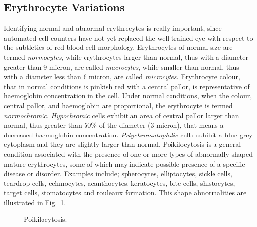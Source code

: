 \documentclass[final,a4paper,12pt,english]{UnicaPhdThesis3}
\begin{document}
	\subsection{Erythrocyte Variations}
	Identifying normal and abnormal erythrocytes is really important, since automated cell counters have not yet replaced the well-trained eye with respect to the subtleties of red blood cell morphology. Erythrocytes of normal size are termed \textit{normocytes}, while erythrocytes larger than normal, thus with a diameter greater than 9 micron, are called \textit{macrocytes}, while smaller than normal, thus with a diameter less than 6 micron, are called \textit{microcytes}. Erythrocyte colour, that in normal conditions is pinkish red with a central pallor, is representative of haemoglobin concentration in the cell. Under normal conditions, when the colour, central pallor, and haemoglobin are proportional, the erythrocyte is termed \textit{normochromic}. \textit{Hypochromic} cells exhibit an area of central pallor larger than normal, thus greater than 50\% of the diameter (3 micron), that means a decreased haemoglobin concentration. \textit{Polychromatophilic} cells exhibit a blue-grey cytoplasm and they are slightly larger than normal. Poikilocytosis is a general condition associated with the presence of one or more types of abnormally shaped mature erythrocytes, some of which may indicate possible presence of a specific disease or disorder. Examples include; spherocytes, elliptocytes, sickle cells, teardrop cells, echinocytes, acanthocytes, keratocytes, bite cells, shistocytes, target cells, stomatocytes and rouleaux formation. This shape abnormalities are illustrated in Fig.~\ref{fig:Poikilocytosis}.
	
	\begin{figure}[!htbp]
		\centering
		\caption{\label{fig:Poikilocytosis} Poikilocytosis.}
	\end{figure}
	
\end{document}

